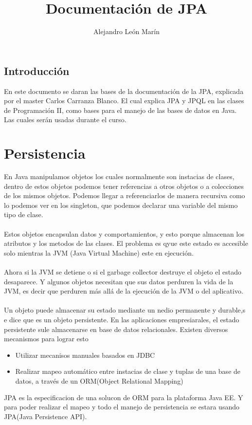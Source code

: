 \documentclass{article}
\title{Documentación de JPA}
\author{Alejandro León Marín}
\begin{document}
\maketitle
\newpage

\begin{center}
	\section*{Introducción}
	En este documento se daran las bases de la documentación de la JPA, explicada por
	el master Carlos Carranza Blanco. El cual explica JPA y JPQL en las clases de
	Programación II, como bases para el manejo de las bases de datos en Java. Las cuales
	serán usadas durante el curso.
\end{center}
\newpage

\section*{ Persistencia }
En Java manipulamos objetos los cuales normalmente son instacias de clases, dentro de estos objetos podemos
tener referencias a otros objetos o a colecciones de los mismos objetos. Podemos llegar a referenciarlos de
manera recursiva como lo podemos ver en los singleton, que podemos declarar una variable del mismo tipo de clase.\\ \\
Estos objetos encapsulan datos y comportamientos, y esto porque almacenan los atributos y los metodos de las clases. El
problema es qyue este estado es accesible solo mientras la JVM (Java Virtual Machine) este en ejecución. \\ \\
Ahora si la JVM se detiene o si el garbage collector destruye el objeto el estado desaparece. Y algunos objetos necesitan que sus datos
perduren la vida de la JVM, es decir que perduren más allá de la ejecución de la JVM o del aplicativo.  \\ \\
Un objeto puede almacenar su estado mediante un nedio permanente y durable,s e dice que es un objeto persistente. En las
aplicaciones empresiarales, el estado persistente sule almacenarse en base de datos relacionales. Existen diversos mecanismos
para lograr esto
\begin{itemize}
	\item Utilizar mecanisos manuales basados en JDBC
	\item Realizar mapeo automático entre instacias de clase y tuplas de una base de datos, a través de un ORM(Object Relational Mapping)
\end{itemize}
JPA es la especificacion de una solucon de ORM para la plataforma Java EE. Y para poder realizar el mapeo y todo el manejo de persistencia
se estara usando JPA(Java Persistence API).\\ \\
\end{document}
